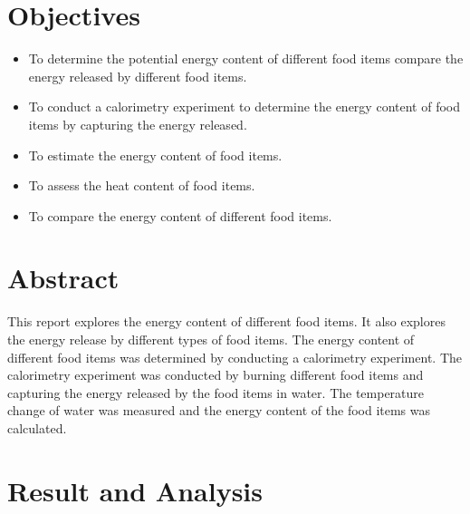 \documentclass[a4paper, 12pt, english]{article}
\begin{document}


\newpage
\section{Objectives}
\begin{itemize}
	\item To determine the potential energy content of different food items compare the
	      energy released by different food items.
	\item To conduct a calorimetry experiment to determine the energy content of food
	      items by capturing the energy released.
	\item To estimate the energy content of food items.
	\item To assess the heat content of food items.
	\item To compare the energy content of different food items.
\end{itemize}

\section{Abstract}
This report explores the energy content of different food items. It also
explores the energy release by different types of food items. The
energy content of different food items was determined by conducting a
calorimetry experiment. The calorimetry experiment was conducted by burning
different food items and capturing the energy released by the food items in
water. The temperature change of water was measured and the energy content of
the food items was calculated.

\section{Result and Analysis}
\end{document}
